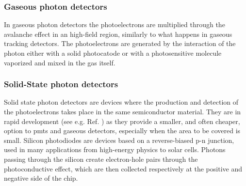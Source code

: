 \subsubsection*{Gaseous photon detectors}
In gaseous photon detectors the photoelectrons are multiplied through the avalanche effect in an high-field region, similarly to what happens in gaseous tracking detectors. The photoelectrons are generated by the interaction of the photon either with a solid photocatode or with a photosensitive molecule vaporized and mixed in the gas itself. 

\subsubsection*{Solid-State photon detectors}
Solid state photon detectors are devices where the production and detection of the photoelectrons takes place in the same semiconductor material. They are in rapid development (see e.g. Ref. \cite{Renker:2009zz}) as they provide a smaller, and often cheaper, option to \glspl{pmt} and gaseous detectors, especially when the area to be covered is small. 
Silicon photodiodes are devices based on a reverse-biased p-n junction, used in many applications from high-energy physics to solar cells. 
Photons passing through the silicon create electron-hole pairs through the photoconductive effect, which are then collected respectively at the positive and negative side of the chip. 



